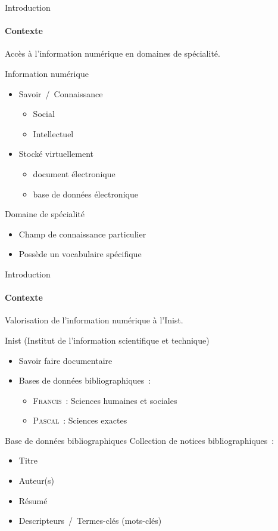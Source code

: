 \begin{frame}{Introduction}\framesubtitle{Contexte}
  Accès à l'information numérique en domaines de spécialité.

  \begin{block}{Information numérique}
    \begin{itemize}
      \item{Savoir~/~Connaissance}
      \begin{itemize}
        \item{Social}
        \item{Intellectuel}
      \end{itemize}
      \item{Stocké virtuellement}
      \begin{itemize}
        \item{document électronique}
        \item{base de données électronique}
      \end{itemize}
    \end{itemize}
  \end{block}

  \begin{block}{Domaine de spécialité}
    \begin{itemize}
      \item{Champ de connaissance particulier}
      \item{Possède un vocabulaire spécifique}
    \end{itemize}
  \end{block}
\end{frame}

\begin{frame}{Introduction}\framesubtitle{Contexte}
  Valorisation de l'information numérique à l'Inist.

  \begin{block}{Inist (Institut de l'information scientifique et technique)}
    \begin{itemize}
      \item{Savoir faire documentaire}
      \item{Bases de données bibliographiques~:}
      \begin{itemize}
        \item{\textsc{Francis}~: Sciences humaines et sociales}
        \item{\textsc{Pascal}~: Sciences exactes}
      \end{itemize}
    \end{itemize}
  \end{block}

  \begin{block}{Base de données bibliographiques}
    Collection de notices bibliographiques~:
    \begin{itemize}
      \item{Titre}
      \item{Auteur(s)}
      \item{Résumé}
      \item{Descripteurs~/~Termes-clés (mots-clés)}
    \end{itemize}
  \end{block}
\end{frame}

